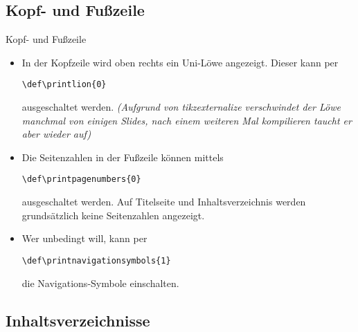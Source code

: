 \documentclass[hyperref={bookmarks=false},11pt,dvipsnames]{beamer}
\begin{document}
\subsection{Kopf- und Fußzeile}

\begin{frame}[t]{Kopf- und Fußzeile}
	\begin{itemize}
		\item In der Kopfzeile wird oben rechts ein Uni-Löwe angezeigt. Dieser kann per
		      \begin{alltt}
			      \textbackslash{}def\textbackslash{}printlion\{0\}
		      \end{alltt}
		      ausgeschaltet werden. \emph{(Aufgrund von tikzexternalize verschwindet der Löwe manchmal von einigen Slides, nach einem weiteren Mal kompilieren taucht er aber wieder auf)}

		\item Die Seitenzahlen in der Fußzeile können mittels
		      \begin{alltt}
			      \textbackslash{}def\textbackslash{}printpagenumbers\{0\}
		      \end{alltt}
		      ausgeschaltet werden. Auf Titelseite und Inhaltsverzeichnis werden grundsätzlich keine Seitenzahlen angezeigt.

		\item Wer unbedingt will, kann per
		      \begin{alltt}
			      \textbackslash{}def\textbackslash{}printnavigationsymbols\{1\}
		      \end{alltt}
		      die Navigations-Symbole einschalten.

	\end{itemize}

\end{frame}

\subsection{Inhaltsverzeichnisse}
\end{document}
